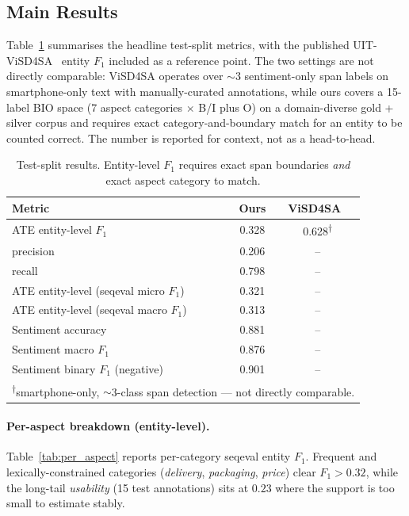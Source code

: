\documentclass[conference]{IEEEtran}
\begin{document}
\subsection{Main Results}

Table~\ref{tab:results} summarises the headline test-split metrics, with
the published UIT-ViSD4SA~\cite{luc2021uit} entity $F_1$ included as a
reference point. The two settings are not directly comparable: ViSD4SA
operates over $\sim$3 sentiment-only span labels on smartphone-only text
with manually-curated annotations, while ours covers a 15-label
BIO space (7 aspect categories $\times$ B/I plus O) on a domain-diverse
gold + silver corpus and requires exact category-and-boundary match for
an entity to be counted correct. The number is reported for context, not
as a head-to-head.

\begin{table}[t]
\caption{Test-split results. Entity-level $F_1$ requires exact span
boundaries \emph{and} exact aspect category to match.}
\label{tab:results}
\centering
\begin{tabular}{lcc}
\toprule
Metric                                            & Ours    & ViSD4SA~\cite{luc2021uit} \\
\midrule
ATE entity-level $F_1$                            & 0.328   & 0.628\textsuperscript{$\dagger$} \\
\quad precision                                   & 0.206   & --      \\
\quad recall                                      & 0.798   & --      \\
ATE entity-level (seqeval micro $F_1$)            & 0.321   & --      \\
ATE entity-level (seqeval macro $F_1$)            & 0.313   & --      \\
Sentiment accuracy                                & 0.881   & --      \\
Sentiment macro $F_1$                             & 0.876   & --      \\
Sentiment binary $F_1$ (negative)                 & 0.901   & --      \\
\bottomrule
\multicolumn{3}{l}{\footnotesize\textsuperscript{$\dagger$}smartphone-only,
$\sim$3-class span detection — not directly comparable.}
\end{tabular}
\end{table}

\paragraph{Per-aspect breakdown (entity-level).}
Table~\ref{tab:per_aspect} reports per-category seqeval entity $F_1$.
Frequent and lexically-constrained categories (\textit{delivery},
\textit{packaging}, \textit{price}) clear $F_1 > 0.32$, while the
long-tail \textit{usability} (15 test annotations) sits at $0.23$ where
the support is too small to estimate stably.
\end{document}
